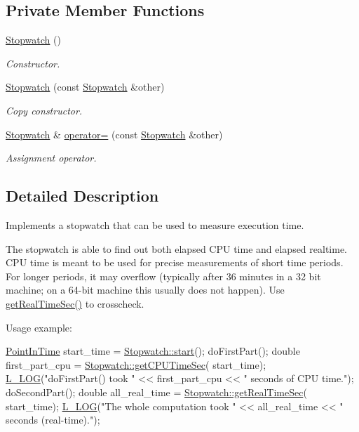 \subsection*{Private Member Functions}
\begin{DoxyCompactItemize}
\item 
\hyperlink{classStopwatch_a628b5ebeed5df065dd847e68fb6336cf}{Stopwatch} ()
\begin{DoxyCompactList}\small\item\em Constructor. \end{DoxyCompactList}\item 
\hyperlink{classStopwatch_a53702b14c791136a2e333fad94fecbf0}{Stopwatch} (const \hyperlink{classStopwatch}{Stopwatch} \&other)
\begin{DoxyCompactList}\small\item\em Copy constructor. \end{DoxyCompactList}\item 
\hyperlink{classStopwatch}{Stopwatch} \& \hyperlink{classStopwatch_a70e4b31db345295ec12253d1f68dc288}{operator=} (const \hyperlink{classStopwatch}{Stopwatch} \&other)
\begin{DoxyCompactList}\small\item\em Assignment operator. \end{DoxyCompactList}\end{DoxyCompactItemize}


\subsection{Detailed Description}
Implements a stopwatch that can be used to measure execution time. 

The stopwatch is able to find out both elapsed C\-P\-U time and elapsed realtime. C\-P\-U time is meant to be used for precise measurements of short time periods. For longer periods, it may overflow (typically after 36 minutes in a 32 bit machine; on a 64-\/bit machine this usually does not happen). Use \hyperlink{classStopwatch_a700dbdfb01479ece147c15d149eba157}{get\-Real\-Time\-Sec()} to crosscheck.

Usage example\-: 
\begin{DoxyCode}
\hyperlink{Stopwatch_8h_af3a9f634f27bed7e98dbc23e5c6f807d}{PointInTime} start\_time = \hyperlink{classStopwatch_ae4e530c454d40a88256a76744d3d8a12}{Stopwatch::start}();
doFirstPart();
\textcolor{keywordtype}{double} first\_part\_cpu = \hyperlink{classStopwatch_a27dda7191760c2822e3aad879805e013}{Stopwatch::getCPUTimeSec}(
      start\_time);
\hyperlink{Logger_8h_a081139c373685d15bfc9f0afebe00542}{L\_LOG}(\textcolor{stringliteral}{"doFirstPart() took "} << first\_part\_cpu << \textcolor{stringliteral}{" seconds of CPU time."});
doSecondPart();
\textcolor{keywordtype}{double} all\_real\_time = \hyperlink{classStopwatch_a700dbdfb01479ece147c15d149eba157}{Stopwatch::getRealTimeSec}(
      start\_time);
\hyperlink{Logger_8h_a081139c373685d15bfc9f0afebe00542}{L\_LOG}(\textcolor{stringliteral}{"The whole computation took "} << all\_real\_time << \textcolor{stringliteral}{" seconds
       (real-time)."});
\end{DoxyCode}


